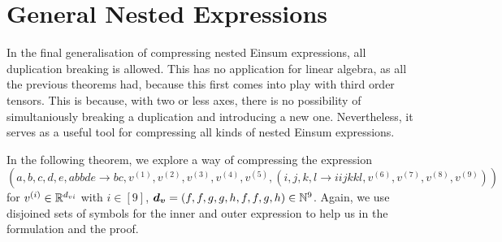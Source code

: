 \section{General Nested Expressions}

In the final generalisation of compressing nested Einsum expressions, all duplication breaking is allowed.
This has no application for linear algebra, as all the previous theorems had, because this first comes into play with third order tensors.
This is because, with two or less axes, there is no possibility of simultaniously breaking a duplication and introducing a new one.
Nevertheless, it serves as a useful tool for compressing all kinds of nested Einsum expressions.

In the following theorem, we explore a way of compressing the expression
$$(a,b,c,d,e,abbde \rightarrow bc, v^{(1)}, v^{(2)}, v^{(3)}, v^{(4)}, v^{(5)}, (
    i,j,k,l \rightarrow iijkkl, v^{(6)}, v^{(7)}, v^{(8)}, v^{(9)}
    ))$$
for $v^{(i)} \in \mathbb{R}^{d_{vi}}$ with $i \in [9]$, $\bm{d_v} = (f, f, g, g, h, f, f, g, h) \in \mathbb{N}^{9}$.
Again, we use disjoined sets of symbols for the inner and outer expression to help us in the formulation and the proof.

